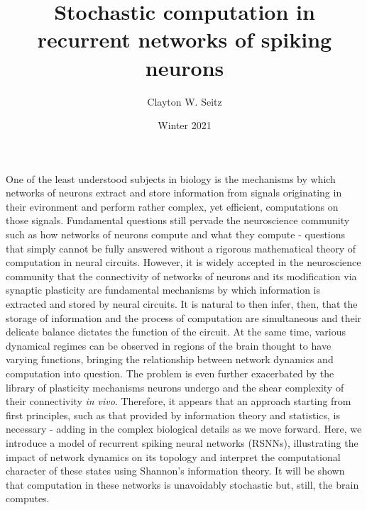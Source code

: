 \documentclass{ucetd}
\title{Stochastic computation in recurrent networks of spiking neurons}
\author{Clayton W. Seitz}
\date{Winter 2021}
\begin{document}
\maketitle

\makecopyright
\makeepigraph


\tableofcontents

\acknowledgments

\abstract
One of the least understood subjects in biology is the mechanisms by which networks of neurons extract and store information from signals originating in their evironment and perform rather complex, yet efficient, computations on those signals. Fundamental questions still pervade the neuroscience community such as how networks of neurons compute and what they compute - questions that simply cannot be fully answered without a rigorous mathematical theory of computation in neural circuits. However, it is widely accepted in the neuroscience community that the connectivity of networks of neurons and its modification via synaptic plasticity are fundamental mechanisms by which information is extracted and stored by neural circuits. It is natural to then infer, then, that the storage of information and the process of computation are simultaneous and their delicate balance dictates the function of the circuit. At the same time, various dynamical regimes can be observed in regions of the brain thought to have varying functions, bringing the relationship between network dynamics and computation into question. The problem is even further exacerbated by the library of plasticity mechanisms neurons undergo and the shear complexity of their connectivity \emph{in vivo}. Therefore, it appears that an approach starting from first principles, such as that provided by information theory and statistics, is necessary - adding in the complex biological details as we move forward. Here, we introduce a model of recurrent spiking neural networks (RSNNs), illustrating the impact of network dynamics on its topology and interpret the computational character of these states using Shannon's information theory. It will be shown that computation in these networks is unavoidably stochastic but, still, the brain computes.
\end{document}
